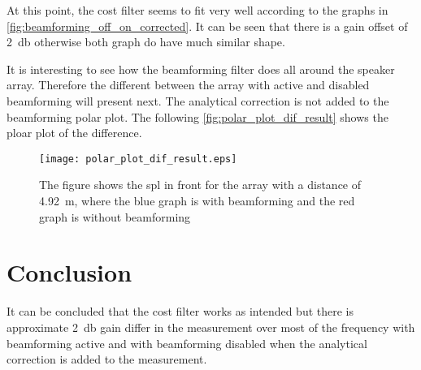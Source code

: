 At this point, the cost filter seems to fit very well according to the graphs in \autoref{fig:beamforming_off_on_corrected}. It can be seen that there is a gain offset of \SI{2}{\decibel} otherwise both graph do have much similar shape. 

It is interesting to see how the beamforming filter does all around the speaker array. Therefore the different between the array with active and disabled beamforming will present next. The analytical correction is not added to the beamforming polar plot. The following \autoref{fig:polar_plot_dif_result} shows the ploar plot of the difference. 


 \begin{figure}[H]
	\centering
	\texttt{[image: polar\_plot\_dif\_result.eps]}
	\caption{The figure shows the \gls{spl} in front for the array with a distance of \SI{4.92}{\meter}, where the blue graph is with beamforming and the red graph is without beamforming}
		\label{fig:polar_plot_dif_result}
\end{figure}




\section{Conclusion}
It can be concluded that the cost filter works as intended but there is approximate \SI{2}{\decibel} gain differ in the measurement over most of the frequency with beamforming active and with beamforming disabled when the analytical correction is added to the measurement. 


